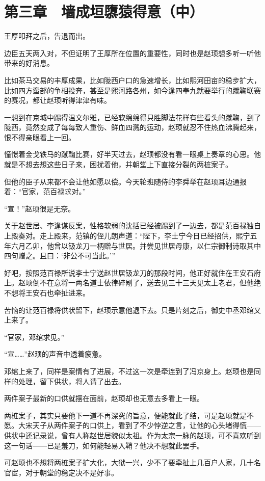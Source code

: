 \section{第三章　墙成垣隳猿得意（中）}

王厚叩拜之后，告退而出。

边臣五天两入对，不但证明了王厚所在位置的重要性，同时也是赵顼想多听一听他带来的好消息。

比如茶马交易的丰厚成果，比如陇西户口的急速增长，比如熙河田亩的稳步扩大，比如四方蛮部的争相投奔，甚至是熙河路各州，如今逢四奉九就要举行的蹴鞠联赛的赛况，都让赵顼听得津津有味。

一想到在京城中踢得温文尔雅，已经软绵绵得只胜脚法花样有些看头的蹴鞠，到了陇西，竟然变成了每每致人重伤、鲜血四溅的运动，赵顼就忍不住热血沸腾起来，恨不得亲眼看上一回。

憧憬着金戈铁马的蹴鞠比赛，好半天过去，赵顼都没有看一眼桌上奏章的心思。他就是不想去想这些日子来，困扰着他，并朝堂上下直接分裂的两桩案子。

但他的臣子从来都不会让他如愿以偿。今天轮班随侍的李舜举在赵顼耳边通报着：“官家，范百禄求对。”

“宣！”赵顼很是无奈。

关于赵世居、李逢谋反案，性格软弱的沈括已经被踢到了一边去，都是范百禄独自上殿奏对。走上殿来，范镇的侄儿朗声道：“陛下，李士宁今日已经招供，熙宁五年六月乙卯，他曾以钑龙刀一柄赠与世居。并尝见世居母康，以仁宗御制诗取其中四句赠之。且曰：‘非公不可当此。’”

好吧，按照范百禄所说李士宁送赵世居钑龙刀的那段时间，他正好就住在王安石府上。赵顼倒不在意将一两名道士依律碎剐了，送去见三十三天见太上老君，但他绝不想将王安石也牵扯进来。

苦恼的让范百禄将供状留下，赵顼示意他退下去。只是片刻之后，御史中丞邓绾又上来了。

“官家，邓绾求见。”

“宣……”赵顼的声音中透着疲惫。

邓绾上来了，同样是案情有了进展，不过这一次是牵连到了冯京身上。赵顼也是同样的处理，留下供状，将人请了出去。

两件案子最新的口供就摆在面前，赵顼却也无意去多看上一眼。

两桩案子，其实只要他下一道不再深究的旨意，便能就此了结，可是赵顼就是不愿。大宋天子从两件案子的口供上，看到了不少悖逆之言，让他的心头堵得慌——供状中还记录说，曾有人称赵世居貌似太祖。作为太宗一脉的赵顼，可不喜欢听到这一句话——已是羞刀，如何能轻易入鞘？他决不想就此罢手。

可赵顼也不想将两桩案子扩大化，大狱一兴，少不了要牵扯上几百户人家，几十名官宦，对于朝堂的稳定决不是好事。

